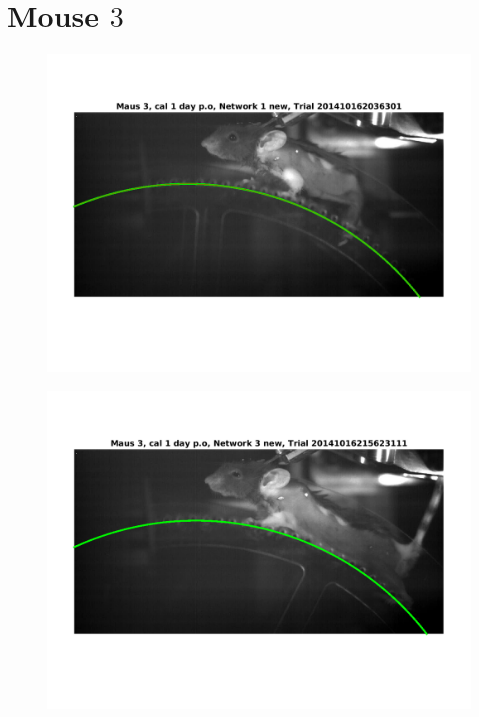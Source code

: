 \documentclass[
	fontsize=12pt,
	paper=a4,
	twoside=false,
	numbers=noenddot,
	plainheadsepline,
	toc=listof,
	toc=bibliography
]{scrartcl}
\begin{document}
\FloatBarrier



\section*{Mouse $3$}


\begin{figure} [htb]
	\centering
	\includegraphics[scale = 0.6]{images/mouse3/result_Maus_3_cal_1_day_Network_1_new_2.png}
\end{figure}
\begin{figure} [htb] \centering
	\includegraphics[scale = 0.6]{images/mouse3/result_Maus_3_cal_1_day_Network_3_new.png}
\end{figure}
\end{document}
